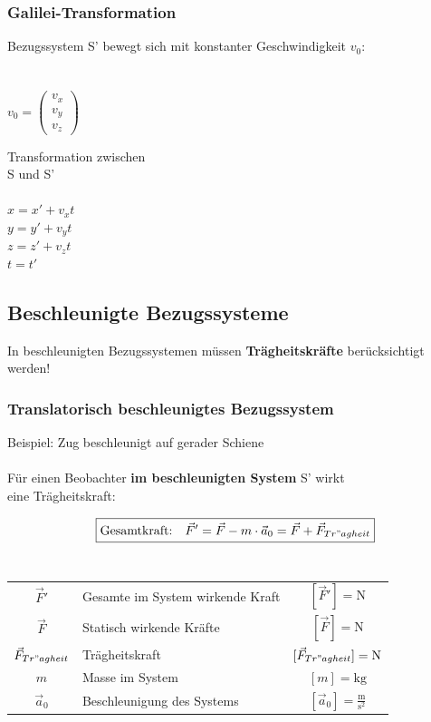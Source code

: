 		\subsubsection{Galilei-Transformation}
			\begin{minipage}{0.48\linewidth}
				Bezugssystem S' bewegt sich mit konstanter Geschwindigkeit $v_0$: \\
				\\
				\\
				$v_0 = \begin{pmatrix}v_x \\ v_y \\ v_z\end{pmatrix}$
			\end{minipage}
			\hfill
			\begin{minipage}{0.42\linewidth}
				Transformation zwischen \\
				S und S' \\
				\\
				$x = x' + v_x t$ \\
				$y = y' + v_y t$ \\
				$z  = z' + v_z t$ \\
				$t = t'$
			\end{minipage}

	\subsection{Beschleunigte Bezugssysteme}
		In beschleunigten Bezugssystemen müssen \textbf{Trägheitskräfte} berücksichtigt werden!

		\subsubsection{Translatorisch beschleunigtes Bezugssystem}
			Beispiel: Zug beschleunigt auf gerader Schiene \\
			\\
			Für einen Beobachter \textbf{im beschleunigten System} S' wirkt \\
			eine Trägheitskraft: 
			
			$$ \boxed{ \text{Gesamtkraft:} \quad \vec{F}' = \vec{F} - m \cdot \vec{a}_0 = \vec{F} + \vec{F}_{Tr"agheit} }$$ \\
			
			\begin{tabular}{c l c}
				$\vec{F}'$ & Gesamte im System wirkende Kraft & $[\vec{F}'] = \mathrm{N}$ \\
				$\vec{F}$ & Statisch wirkende Kräfte & $[\vec{F}] = \mathrm{N}$ \\
				$\vec{F}_{Tr"agheit}$ & Trägheitskraft & $[\vec{F}_{Tr"agheit}] = \mathrm{N}$ \\
				$m$ & Masse im System & $[m] = \mathrm{kg}$ \\
				$\vec{a}_0$ & Beschleunigung des Systems & $[\vec{a}_0] = \mathrm{\frac{m}{s^2}}$ \\
			\end{tabular}

